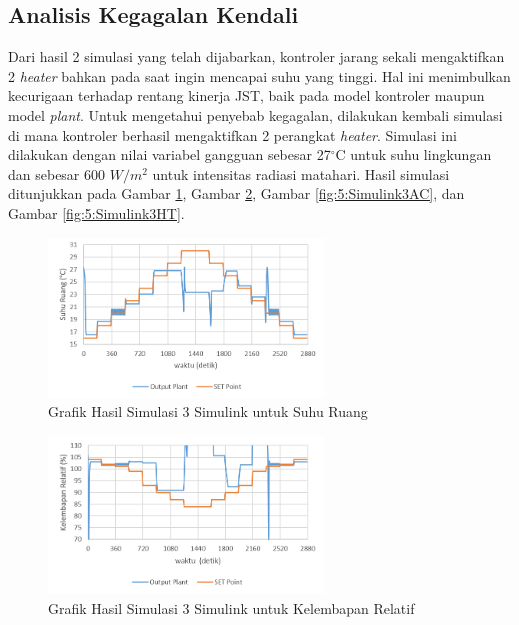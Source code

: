 \subsection{Analisis Kegagalan Kendali}

Dari hasil 2 simulasi yang telah dijabarkan, kontroler jarang sekali mengaktifkan 2 \textit{heater} bahkan pada saat ingin mencapai suhu yang tinggi. Hal ini menimbulkan kecurigaan terhadap rentang kinerja JST, baik pada model kontroler maupun model \textit{plant}. Untuk mengetahui penyebab kegagalan, dilakukan kembali simulasi di mana kontroler berhasil mengaktifkan 2 perangkat \textit{heater}. Simulasi ini dilakukan dengan nilai variabel gangguan sebesar 27$^\circ$C untuk suhu lingkungan dan sebesar 600 $W/m^2$ untuk intensitas radiasi matahari. Hasil simulasi ditunjukkan pada Gambar \ref{fig:5:Simulink3Td}, Gambar \ref{fig:5:Simulink3RH}, Gambar \ref{fig:5:Simulink3AC}, dan Gambar \ref{fig:5:Simulink3HT}.

\begin{figure}[!h]
	\centering
	\includegraphics[width=0.65\textwidth]{figures/Simulink3Td}
	\caption{Grafik Hasil Simulasi 3 Simulink untuk Suhu Ruang}
	\label{fig:5:Simulink3Td}
\end{figure}
\vspace{1em}

\begin{figure}[!h]
	\centering
	\includegraphics[width=0.65\textwidth]{figures/Simulink3RH}
	\caption{Grafik Hasil Simulasi 3 Simulink untuk Kelembapan Relatif}
	\label{fig:5:Simulink3RH}
\end{figure}

